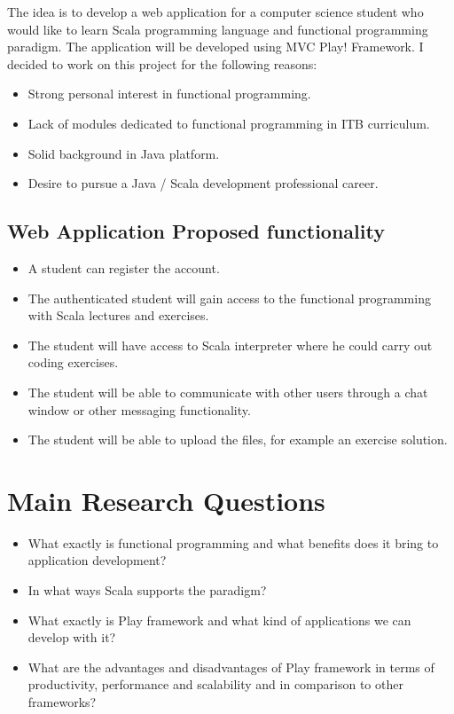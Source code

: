 \documentclass[12pt,twoside,a4paper]{report}
\begin{document}
The idea is to develop a web application for a computer science student who would like to learn Scala programming language and functional programming paradigm. The application will be developed using MVC Play! Framework. I decided to work on this project for the following reasons:

\begin{itemize}
\item Strong personal interest in functional programming.
\item Lack of modules dedicated to functional programming in ITB curriculum.
\item Solid background in Java platform.
\item Desire to pursue a Java / Scala development professional career.
\end{itemize}

\subsection{Web Application Proposed functionality}

\begin{itemize}
\item A student can register the account.
\item The authenticated student will gain access to the functional programming with Scala lectures and exercises.
\item The student will have access to Scala interpreter where he could carry out coding exercises.
\item The student will be able to communicate with other users through a chat window or other messaging functionality.
\item The student will be able to upload the files, for example an exercise solution.
\end{itemize}

\section{Main Research Questions}

\begin{itemize}
\item What exactly is functional programming and what benefits does it bring to application development?
\item In what ways Scala supports the paradigm?
\item What exactly is Play framework and what kind of applications we can develop with it?
\item What are the advantages and disadvantages of Play framework in terms of productivity, performance and scalability and in comparison to other frameworks?
\end{itemize}
\end{document}
